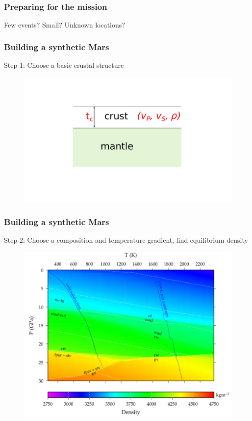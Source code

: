 \documentclass[compress,framenumber]{beamer}
\begin{document}
\begin{frame}
  \frametitle{Preparing for the mission}
  Few events? Small? Unknown locations?
\end{frame}

\begin{frame}
  \frametitle{Building a synthetic Mars}

  \vspace{1.0em}
  Step 1: Choose a basic crustal structure
  \vspace{-1.0em}
  \begin{figure}
    \includegraphics[width=0.75\linewidth]{figures/crust.pdf}
  \end{figure}
\end{frame}

\begin{frame}
  \frametitle{Building a synthetic Mars}

  Step 2: Choose a composition and temperature gradient, find equilibrium density
  \vspace{-1.0em}
  \begin{figure}
    \includegraphics[width=0.7\linewidth]{figures/P_T_rho.pdf}
  \end{figure}
\end{frame}
\end{document}
